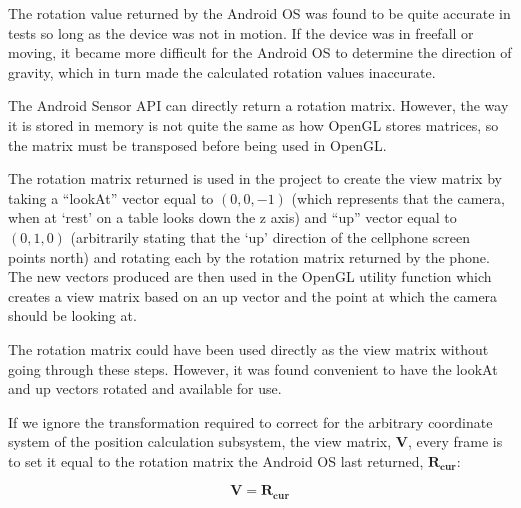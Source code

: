 The rotation value returned by the Android OS was found to be quite accurate in tests so long as the device was not in motion. If the device was in freefall or moving, it became more difficult for the Android OS to determine the direction of gravity, which in turn made the calculated rotation values inaccurate.

The Android Sensor API can directly return a rotation matrix. However, the way it is stored in memory is not quite the same as how OpenGL stores matrices, so the matrix must be transposed before being used in OpenGL.

The rotation matrix returned is used in the project to create the view matrix by taking a ``lookAt'' vector equal to $(0, 0, -1)$ (which represents that the camera, when at `rest' on a table looks down the z axis) and ``up'' vector equal to $(0, 1, 0)$ (arbitrarily stating that the `up' direction of the cellphone screen points north) and rotating each by the rotation matrix returned by the phone. The new vectors produced are then used in the OpenGL utility function  which creates a view matrix based on an up vector and the point at which the camera should be looking at.

The rotation matrix could have been used directly as the view matrix without going through these steps. However, it was found convenient to have the lookAt and up vectors rotated and available for use. 

If we ignore the transformation required to correct for the arbitrary coordinate system of the position calculation subsystem, the view matrix, $\mathbf{V}$, every frame is to set it equal to the rotation matrix the Android OS last returned, $\mathbf{R_{cur}}$:

\[
	\mathbf{V} = \mathbf{R_{cur}}
\]

